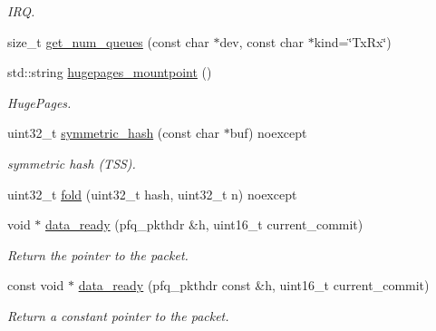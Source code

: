 \begin{DoxyCompactItemize}
\begin{DoxyCompactList}\small\item\em I\+RQ. \end{DoxyCompactList}\item 
size\+\_\+t \hyperlink{namespacepfq_a35dc28fdd850e9c82f1f3861cce2f9cb}{get\+\_\+num\+\_\+queues} (const char $\ast$dev, const char $\ast$kind=\char`\"{}Tx\+Rx\char`\"{})
\item 
std\+::string \hyperlink{namespacepfq_a46be800e747d99af1db9b92a8f296930}{hugepages\+\_\+mountpoint} ()
\begin{DoxyCompactList}\small\item\em Huge\+Pages. \end{DoxyCompactList}\item 
uint32\+\_\+t \hyperlink{namespacepfq_acd3646943e133a2651876f9ca0bd154c}{symmetric\+\_\+hash} (const char $\ast$buf) noexcept
\begin{DoxyCompactList}\small\item\em symmetric hash (T\+SS). \end{DoxyCompactList}\item 
uint32\+\_\+t \hyperlink{namespacepfq_a881bd432d152026217ddbf0ae5d72833}{fold} (uint32\+\_\+t hash, uint32\+\_\+t n) noexcept
\item 
void $\ast$ \hyperlink{namespacepfq_aa380c5b13ef3af69ccd6e1090b388891}{data\+\_\+ready} (pfq\+\_\+pkthdr \&h, uint16\+\_\+t current\+\_\+commit)
\begin{DoxyCompactList}\small\item\em Return the pointer to the packet. \end{DoxyCompactList}\item 
const void $\ast$ \hyperlink{namespacepfq_a992de53ff3615a0e00640bde94726b24}{data\+\_\+ready} (pfq\+\_\+pkthdr const \&h, uint16\+\_\+t current\+\_\+commit)
\begin{DoxyCompactList}\small\item\em Return a constant pointer to the packet. \end{DoxyCompactList}\end{DoxyCompactItemize}
